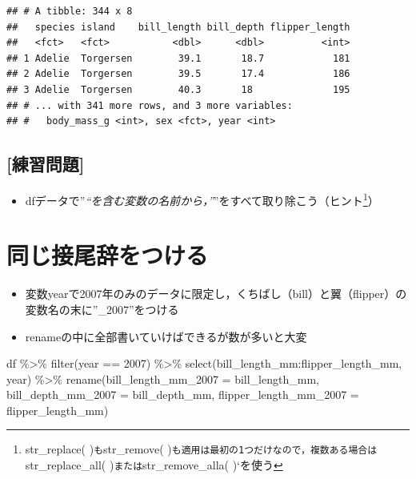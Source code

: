 \documentclass[
  xelatex,ja=standard, b5paper]{bxjsbook}
\newenvironment{Shaded}{\begin{snugshade}}{\end{snugshade}}
\newcommand{\AttributeTok}[1]{\textcolor[rgb]{0.77,0.63,0.00}{#1}}
\newcommand{\DecValTok}[1]{\textcolor[rgb]{0.00,0.00,0.81}{#1}}
\newcommand{\FunctionTok}[1]{\textcolor[rgb]{0.00,0.00,0.00}{#1}}
\newcommand{\NormalTok}[1]{#1}
\newcommand{\SpecialCharTok}[1]{\textcolor[rgb]{0.00,0.00,0.00}{#1}}
\providecommand{\tightlist}{%
  \setlength{\itemsep}{0pt}\setlength{\parskip}{0pt}}
\begin{document}
\begin{verbatim}
## # A tibble: 344 x 8
##   species island    bill_length bill_depth flipper_length
##   <fct>   <fct>           <dbl>      <dbl>          <int>
## 1 Adelie  Torgersen        39.1       18.7            181
## 2 Adelie  Torgersen        39.5       17.4            186
## 3 Adelie  Torgersen        40.3       18              195
## # ... with 341 more rows, and 3 more variables:
## #   body_mass_g <int>, sex <fct>, year <int>
\end{verbatim}

\hypertarget{ux7df4ux7fd2ux554fux984c-4}{%
\subsection{{[}練習問題{]}}\label{ux7df4ux7fd2ux554fux984c-4}}

\begin{itemize}
\tightlist
\item
  dfデータで''\emph{``を含む変数の名前から，''}''をすべて取り除こう（ヒント\footnote{str\_replace( )\texttt{も}str\_remove( )\texttt{も適用は最初の1つだけなので，複数ある場合は}str\_replace\_all( )\texttt{または}str\_remove\_alla( )`を使う}）
\end{itemize}

\hypertarget{rename-add}{%
\section{同じ接尾辞をつける}\label{rename-add}}

\begin{itemize}
\tightlist
\item
  変数yearで2007年のみのデータに限定し，くちばし（bill）と翼（flipper）の変数名の末に''\_2007''をつける
\item
  renameの中に全部書いていけばできるが数が多いと大変
\end{itemize}

\begin{Shaded}
\begin{Highlighting}[]
\NormalTok{df }\SpecialCharTok{\%\textgreater{}\%} 
  \FunctionTok{filter}\NormalTok{(year }\SpecialCharTok{==} \DecValTok{2007}\NormalTok{) }\SpecialCharTok{\%\textgreater{}\%} 
  \FunctionTok{select}\NormalTok{(bill\_length\_mm}\SpecialCharTok{:}\NormalTok{flipper\_length\_mm, year) }\SpecialCharTok{\%\textgreater{}\%} 
  \FunctionTok{rename}\NormalTok{(}\AttributeTok{bill\_length\_mm\_2007 =}\NormalTok{ bill\_length\_mm,}
         \AttributeTok{bill\_depth\_mm\_2007  =}\NormalTok{ bill\_depth\_mm,}
         \AttributeTok{flipper\_length\_mm\_2007 =}\NormalTok{ flipper\_length\_mm)}
\end{Highlighting}
\end{Shaded}
\end{document}
